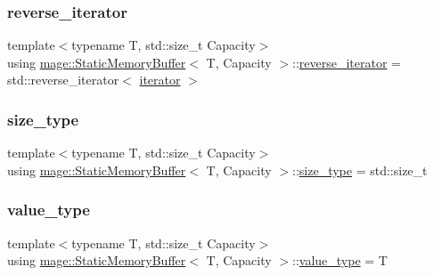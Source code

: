 \mbox{\label{classmage_1_1_static_memory_buffer_a2ea67615d569f1eecb101f4fbe3eb6a7}} 
\subsubsection{\texorpdfstring{reverse\+\_\+iterator}{reverse\_iterator}}
{\footnotesize\ttfamily template$<$typename T, std\+::size\+\_\+t Capacity$>$ \\
using \mbox{\hyperlink{classmage_1_1_static_memory_buffer}{mage\+::\+Static\+Memory\+Buffer}}$<$ T, Capacity $>$\+::\mbox{\hyperlink{classmage_1_1_static_memory_buffer_a2ea67615d569f1eecb101f4fbe3eb6a7}{reverse\+\_\+iterator}} =  std\+::reverse\+\_\+iterator$<$ \mbox{\hyperlink{classmage_1_1_static_memory_buffer_abeee1c933cd54117e1a92de4a1cc698f}{iterator}} $>$}

\mbox{\label{classmage_1_1_static_memory_buffer_a13e19b7af61a49400c5be360f09aadc8}} 
\subsubsection{\texorpdfstring{size\+\_\+type}{size\_type}}
{\footnotesize\ttfamily template$<$typename T, std\+::size\+\_\+t Capacity$>$ \\
using \mbox{\hyperlink{classmage_1_1_static_memory_buffer}{mage\+::\+Static\+Memory\+Buffer}}$<$ T, Capacity $>$\+::\mbox{\hyperlink{classmage_1_1_static_memory_buffer_a13e19b7af61a49400c5be360f09aadc8}{size\+\_\+type}} =  std\+::size\+\_\+t}

\mbox{\label{classmage_1_1_static_memory_buffer_a30a2fd97f8f458d752581dd69e717a97}} 
\subsubsection{\texorpdfstring{value\+\_\+type}{value\_type}}
{\footnotesize\ttfamily template$<$typename T, std\+::size\+\_\+t Capacity$>$ \\
using \mbox{\hyperlink{classmage_1_1_static_memory_buffer}{mage\+::\+Static\+Memory\+Buffer}}$<$ T, Capacity $>$\+::\mbox{\hyperlink{classmage_1_1_static_memory_buffer_a30a2fd97f8f458d752581dd69e717a97}{value\+\_\+type}} =  T}



